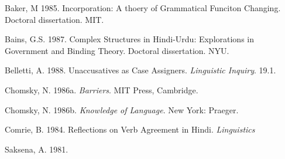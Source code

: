 \documentclass{article}
\begin{document}
\begin{reflist}

Baker, M 1985. Incorporation: A thoery of Grammatical Funciton Changing. Doctoral dissertation. MIT.

Bains, G.S. 1987. Complex Structures in Hindi-Urdu: Explorations in Government and Binding Theory. Doctoral dissertation. NYU.

Belletti, A. 1988. Unaccusatives as Case Assigners. \textit{Linguistic Inquiry}. 19.1.

Chomsky, N. 1986a. \textit{Barriers}. MIT Press, Cambridge.

Chomsky, N. 1986b. \textit{Knowledge of Language}. New York: Praeger.

Comrie, B. 1984. Reflections on Verb Agreement in Hindi. \textit{Linguistics}

Saksena, A. 1981. 

\end{reflist}


\end{document}
